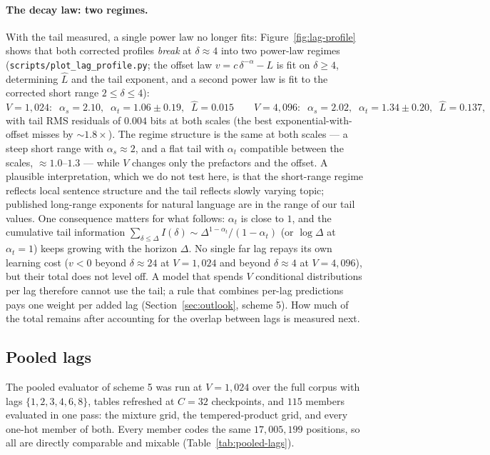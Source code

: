 \documentclass[11pt]{article}
\begin{document}
\paragraph{The decay law: two regimes.}
With the tail measured, a single power law no longer fits:
Figure~\ref{fig:lag-profile} shows that both corrected profiles
\emph{break} at $\delta \approx 4$ into two power-law regimes
(\texttt{scripts/plot\_lag\_profile.py}; the offset law
$v = c\,\delta^{-\alpha} - L$ is fit on $\delta \ge 4$, determining
$\hat L$ and the tail exponent, and a second power law is fit to the
corrected short range $2 \le \delta \le 4$):
\[
  V=1{,}024:\;\; \alpha_s = 2.10,\;\;
  \alpha_t = 1.06 \pm 0.19,\;\; \hat L = 0.015
  \qquad
  V=4{,}096:\;\; \alpha_s = 2.02,\;\;
  \alpha_t = 1.34 \pm 0.20,\;\; \hat L = 0.137,
\]
with tail RMS residuals of $0.004$ bits at both scales (the best
exponential-with-offset misses by $\sim\!1.8\times$).  The regime
structure is the same at both scales --- a steep short range with
$\alpha_s \approx 2$, and a flat tail with $\alpha_t$ compatible
between the scales, $\approx 1.0$--$1.3$ --- while $V$ changes only the
prefactors and the offset.  A plausible interpretation, which we do not
test here, is that the short-range regime reflects local sentence
structure and the tail reflects slowly varying topic; published
long-range exponents for natural language are in the range of our tail
values.  One consequence matters for what follows: $\alpha_t$ is close
to $1$, and the cumulative tail information
$\sum_{\delta \le \Delta} I(\delta) \sim
\Delta^{1-\alpha_t}/(1-\alpha_t)$ (or $\log \Delta$ at
$\alpha_t = 1$) keeps growing with the horizon $\Delta$.  No single far
lag repays its own learning cost ($v < 0$ beyond $\delta \approx 24$ at
$V=1{,}024$ and beyond $\delta \approx 4$ at $V=4{,}096$), but their
total does not level off.  A model that spends $V$ conditional
distributions per lag therefore cannot use the tail; a rule that
combines per-lag predictions pays one weight per added lag
(Section~\ref{sec:outlook}, scheme 5).  How much of the total remains
after accounting for the overlap between lags is measured next.

\subsection*{Pooled lags}
\label{sec:pooled-result}
The pooled evaluator of scheme 5 was run at $V = 1{,}024$ over the
full corpus with lags $\{1,2,3,4,6,8\}$, tables refreshed at $C = 32$
checkpoints, and $115$ members evaluated in one pass: the mixture
grid, the tempered-product grid, and every one-hot member of both.
Every member codes the same $17{,}005{,}199$ positions, so all are
directly comparable and mixable (Table~\ref{tab:pooled-lags}).
\end{document}
